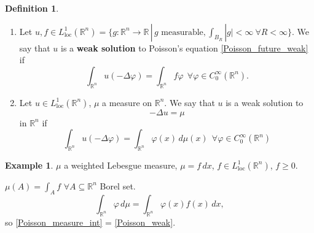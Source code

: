 \documentclass[12pt]{article}
\theoremstyle{definition}
\newtheorem*{definition*}{Definition}
\newtheorem{example}{Example}
\begin{document}
\begin{definition*}
\begin{enumerate}[label=\alph*)]
\item Let $u,f\in L_\text{loc}^1(\mathbb R^n)=\{g:\mathbb R^n\rightarrow\mathbb R\,|\,g\text{ measurable},\int_{B_R}|g|<\infty\ \forall R<\infty\}$. We say that $u$ is a \textbf{weak solution} to Poisson's equation \eqref{Poisson_future_weak} if
\begin{equation}\tag{P$'$}\label{Poisson_weak}
\int_{\mathbb R^n}u(-\Delta\varphi)=\int_{\mathbb R^n}f\varphi\ \ \forall\varphi\in C_0^\infty(\mathbb R^n).
\end{equation}

\item Let $u\in L_\text{loc}^1(\mathbb R^n)$, $\mu$ a measure on $\mathbb R^n$. We say that $u$ is a weak solution to
\begin{equation}\tag{P$_\mu$}\label{Poisson_measure}
-\Delta u=\mu
\end{equation}
in $\mathbb R^n$ if
\begin{equation}\tag{P$_\mu'$}\label{Poisson_measure_int}
\int_{\mathbb R^n}u(-\Delta\varphi)=\int_{\mathbb R^n}\varphi(x)\,d\mu(x)\ \ \forall\varphi\in C_0^\infty(\mathbb R^n)
\end{equation}
\end{enumerate}
\end{definition*}

\begin{example}
$\mu$ a weighted Lebesgue measure, $\mu=f\,dx$, $f\in L_\text{loc}^1(\mathbb R^n)$, $f\geq0$.

$\mu(A)=\int_Af$ $\forall A\subseteq\mathbb R^n$ Borel set.
\[\int_{\mathbb R^n}\varphi\,d\mu=\int_{\mathbb R^n}\varphi(x)f(x)\,dx,\]
so \eqref{Poisson_measure_int} = \eqref{Poisson_weak}.
\end{example}
\end{document}
